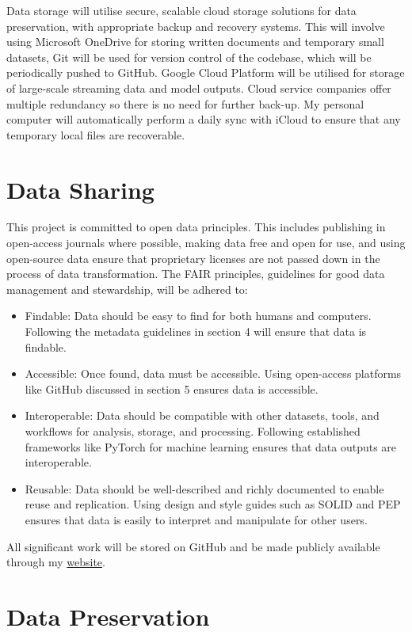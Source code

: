 \documentclass[a4paper, 11pt]{article}
\begin{document}
Data storage will utilise secure, scalable cloud storage solutions for data preservation, with appropriate backup and recovery systems. This will involve using Microsoft OneDrive for storing written documents and temporary small datasets, Git will be used for version control of the codebase, which will be periodically pushed to GitHub. Google Cloud Platform will be utilised for storage of large-scale streaming data and model outputs. Cloud service companies offer multiple redundancy so there is no need for further back-up. My personal computer will automatically perform a daily sync with iCloud to ensure that any temporary local files are recoverable.

\section{Data Sharing}

This project is committed to open data principles. This includes publishing in open-access journals where possible, making data free and open for use, and using open-source data ensure that proprietary licenses are not passed down in the process of data transformation. The FAIR principles, guidelines for good data management and stewardship, will be adhered to:

\begin{itemize}
    \item Findable: Data should be easy to find for both humans and computers. Following the metadata guidelines in section 4 will ensure that data is findable.
    \item Accessible: Once found, data must be accessible. Using open-access platforms like GitHub discussed in section 5 ensures data is accessible.
    \item Interoperable: Data should be compatible with other datasets, tools, and workflows for analysis, storage, and processing. Following established frameworks like PyTorch for machine learning ensures that data outputs are interoperable.
    \item Reusable: Data should be well-described and richly documented to enable reuse and replication. Using design and style guides such as SOLID and PEP ensures that data is easily to interpret and manipulate for other users.
\end{itemize}

All significant work will be stored on GitHub and be made publicly available through my \href{https://carrow.me.uk/}{website}.

\section{Data Preservation}
\end{document}

